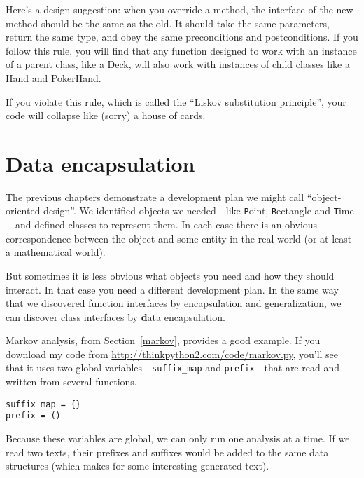 \documentclass[
DIV=11,
fontsize=13,
twoside,
headinclude=false,
titlepage=firstiscover,
abstract=true,
headsepline=true,
footsepline=true,
chapterprefix=true, %
headings=big,
bibliography=totoc,%
captions=tableheading
]{scrbook}
\theoremstyle{definition}
\begin{document}
Here's a design suggestion: when you override a method,
the interface of the new method should be the same as the old.  It
should take the same parameters, return the same type, and obey the
same preconditions and postconditions.  If you follow this rule, you
will find that any function designed to work with an instance of a
parent class, like a Deck, will also work with instances of child
classes like a Hand and PokerHand.

If you violate this rule, which is called the ``Liskov substitution
principle'', your code will collapse like (sorry) a house of cards.


\section{Data encapsulation}

The previous chapters demonstrate a development plan we might call
``object-oriented design''.  We identified objects we needed---like
{\texttt Point}, {\texttt Rectangle} and {\texttt Time}---and defined classes to
represent them.  In each case there is an obvious correspondence
between the object and some entity in the real world (or at least a
mathematical world).  

But sometimes it is less obvious what objects you need
and how they should interact.  In that case you need a different
development plan.  In the same way that we discovered function
interfaces by encapsulation and generalization, we can discover
class interfaces by {\textbf data encapsulation}.

Markov analysis, from Section~\ref{markov}, provides a good example.
If you download my code from \url{http://thinkpython2.com/code/markov.py},
you'll see that it uses two global variables---\verb"suffix_map" and
\verb"prefix"---that are read and written from several functions.

\begin{lstlisting}
suffix_map = {}        
prefix = ()            
\end{lstlisting}

Because these variables are global, we can only run one analysis at a
time.  If we read two texts, their prefixes and suffixes would be
added to the same data structures (which makes for some interesting
generated text).
\end{document}
